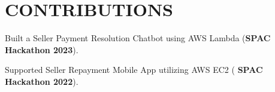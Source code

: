\section{CONTRIBUTIONS}
\begin{onecolentry}
    \begin{highlights}
        \item Built a Seller Payment Resolution Chatbot using AWS Lambda (\textbf{SPAC Hackathon 2023}).
        \item Supported Seller Repayment Mobile App utilizing AWS EC2 (
        \textbf{SPAC Hackathon 2022}).
    \end{highlights}
\end{onecolentry}